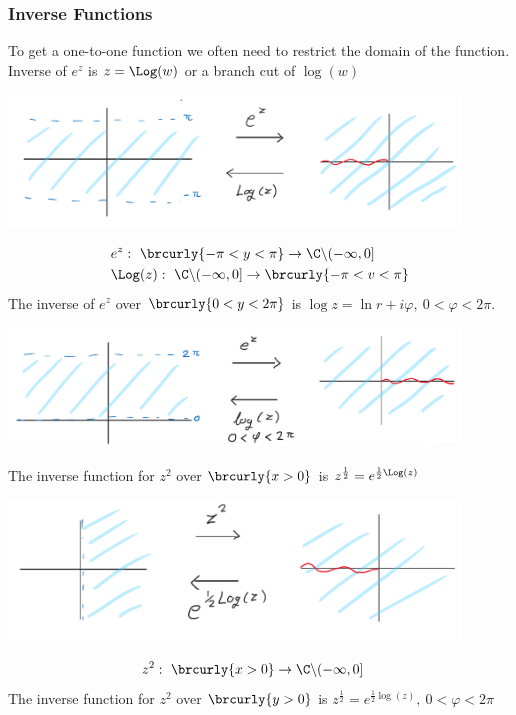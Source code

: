 \subsubsection{Inverse Functions}
To get a one-to-one function we often need to restrict the domain of the function.\\
Inverse of $e^z$ is $z=\Log(w)$ or a branch cut of $\log(w)$\\
\centerline{\includegraphics[width=0.9\textwidth]{Images/ComplexAnalysisPictures/ExponentialInverse.png}}
\begin{align*}
    &e^z:\ \brcurly{-\pi<y<\pi}\to\C\backslash(-\infty,0]\\
    &\Log(z):\ \C\backslash(-\infty,0]\to\brcurly{-\pi<v<\pi}
\end{align*}
The inverse of $e^z$ over $\brcurly{0<y<2\pi}$ is $\log z=\ln r+i\varphi,\ 0<\varphi<2\pi$.\\
\centerline{\includegraphics[width=0.9\textwidth]{Images/ComplexAnalysisPictures/ExponentialInverse2.png}}
The inverse function for $z^2$ over $\brcurly{x>0}$ is $z^\frac{1}{2}=e^{\frac{1}{2}\Log(z)}$\\
\centerline{\includegraphics[width=0.9\textwidth]{Images/ComplexAnalysisPictures/QuadraticInverse.png}}
\begin{align*}
    &z^2:\ \brcurly{x>0}\to\C\backslash(-\infty,0]
\end{align*}
The inverse function for $z^2$ over $\brcurly{y>0}$ is $z^\frac{1}{2}=e^{\frac{1}{2}\log(z)},\ 0<\varphi<2\pi$\\
